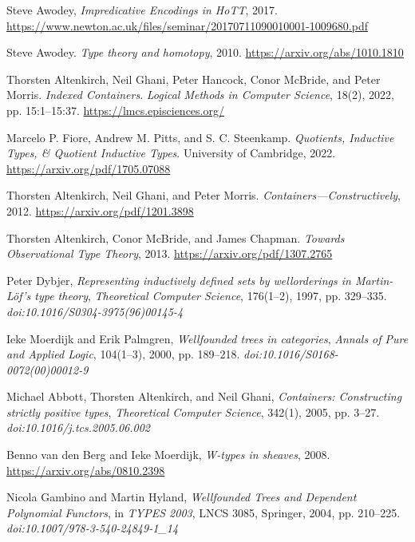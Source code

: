 \documentclass{article}
\begin{document}
\begin{thebibliography}{99}
Steve Awodey,
\textit{Impredicative Encodings in HoTT},
2017.
\url{https://www.newton.ac.uk/files/seminar/20170711090010001-1009680.pdf}

Steve Awodey.
\textit{Type theory and homotopy},
2010.
\url{https://arxiv.org/abs/1010.1810}

Thorsten Altenkirch, Neil Ghani, Peter Hancock, Conor McBride, and Peter Morris.
\textit{Indexed Containers}.
\textit{Logical Methods in Computer Science}, 18(2), 2022, pp. 15:1--15:37.
\url{https://lmcs.episciences.org/}

Marcelo P. Fiore, Andrew M. Pitts, and S. C. Steenkamp.
\textit{Quotients, Inductive Types, \& Quotient Inductive Types}.
University of Cambridge, 2022.
\url{https://arxiv.org/pdf/1705.07088}

Thorsten Altenkirch, Neil Ghani, and Peter Morris.
\textit{Containers—Constructively},
2012.
\url{https://arxiv.org/pdf/1201.3898}

Thorsten Altenkirch, Conor McBride, and James Chapman.
\textit{Towards Observational Type Theory},
2013.
\url{https://arxiv.org/pdf/1307.2765}

Peter Dybjer,
\textit{Representing inductively defined sets by wellorderings in Martin-Löf’s type theory},
\textit{Theoretical Computer Science}, 176(1–2), 1997, pp. 329–335.
\textit{doi:10.1016/S0304-3975(96)00145-4}

Ieke Moerdijk and Erik Palmgren,
\textit{Wellfounded trees in categories},
\textit{Annals of Pure and Applied Logic}, 104(1–3), 2000, pp. 189–218.
\textit{doi:10.1016/S0168-0072(00)00012-9}

Michael Abbott, Thorsten Altenkirch, and Neil Ghani,
\textit{Containers: Constructing strictly positive types},
\textit{Theoretical Computer Science}, 342(1), 2005, pp. 3–27.
\textit{doi:10.1016/j.tcs.2005.06.002}

Benno van den Berg and Ieke Moerdijk,
\textit{W-types in sheaves},
2008.
\url{https://arxiv.org/abs/0810.2398}

Nicola Gambino and Martin Hyland,
\textit{Wellfounded Trees and Dependent Polynomial Functors},
in \textit{TYPES 2003}, LNCS 3085, Springer, 2004, pp. 210–225.
\textit{doi:10.1007/978-3-540-24849-1\_14}


\end{thebibliography}
\end{document}
